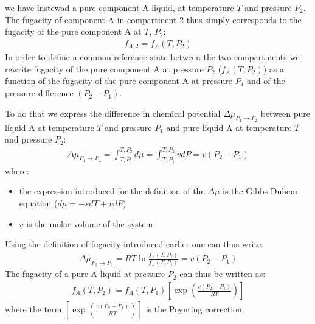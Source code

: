 \documentclass[letterpaper,10pt,english]{jupyterBook}
\begin{document}
\sphinxAtStartPar
{} we have instewad a pure component A liquid, at temperature \(T\) and pressure \(P_2\). The fugacity of component A in compartment 2 thus simply corresponds to the fugacity of the pure component A at \(T\), \(P_2\):
\begin{equation}\label{equation:Osmosis:OSMeq:rightside}
\begin{split}
f_{A,2}=f_A(T,P_2)
\end{split}
\end{equation}
\sphinxAtStartPar
{} In order to define a common reference state between the two compartments we rewrite fugacity of the pure component A at pressure \(P_2\) (\(f_A(T,P_2)\)) as a function of the fugacity of the pure component A at pressure \(P_1\) and of the pressure difference \((P_2-P_1)\).

\sphinxAtStartPar
To do that we express the difference in chemical potential \(\Delta\mu_{P_1\rightarrow{P_2}}\) between pure liquid A at temperature \(T\) and pressure \(P_1\) and pure liquid A at temperature \(T\) and pressure \(P_2\):
\begin{equation}\label{equation:Osmosis:OSMeq1}
\begin{split}
\Delta\mu_{P_1\rightarrow{P_2}}=\int_{T,P_1}^{T,P_2}d\mu=\int_{T,P_1}^{T,P_2}vdP=v(P_2-P_1)
\end{split}
\end{equation}
\sphinxAtStartPar
where:
\begin{itemize}
\item {} 
\sphinxAtStartPar
the expression introduced for the definition of the \(\Delta\mu\) is the Gibbs Duhem equation (\(d{\mu}=-sdT+vdP\))

\item {} 
\sphinxAtStartPar
\(v\) is the molar volume of the system

\end{itemize}

\sphinxAtStartPar
Using the definition of fugacity introduced earlier one can thus write:
\begin{equation}\label{equation:Osmosis:OSMeq2}
\begin{split}
\Delta\mu_{P_1\rightarrow{P_2}}=RT\ln\frac{f_A(T,P_2)}{f_A(T,P_1)}=v(P_2-P_1)
\end{split}
\end{equation}
\sphinxAtStartPar
The fugacity of a pure A liquid at pressure \(P_2\) can thus be written as:
\begin{equation}\label{equation:Osmosis:OSMeq3}
\begin{split}
f_A(T,P_2)={f_A(T,P_1)}\left[\exp\left(\frac{v(P_2-P_1)}{RT}\right)\right]
\label{eq:Poynting}
\end{split}
\end{equation}
\sphinxAtStartPar
where the term \(\left[\exp\left(\frac{v(P_2-P_1)}{RT}\right)\right]\) is the Poynting correction.
\end{document}
